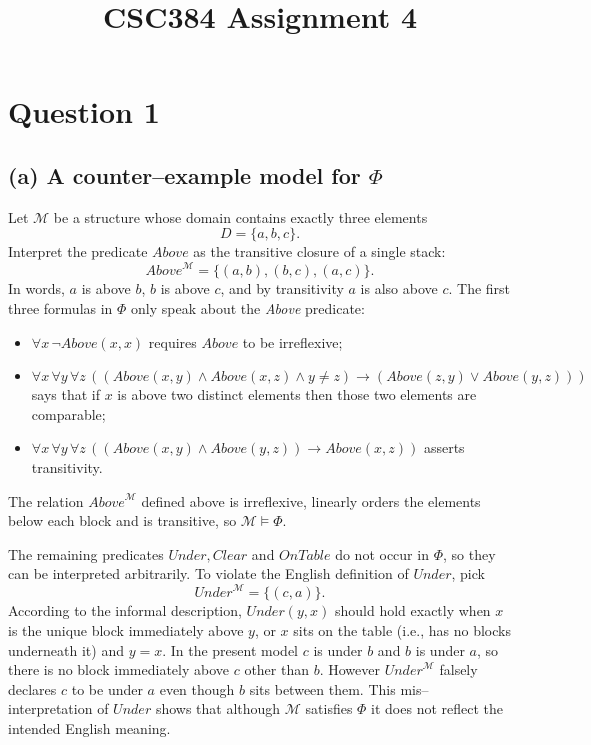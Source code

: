 \documentclass[12pt]{article}
\title{CSC384 Assignment 4}
\author{}
\date{}
\begin{document}
\maketitle

\section*{Question 1}

\subsection*{(a) A counter--example model for $\Phi$}

Let $\mathcal{M}$ be a structure whose domain contains exactly three elements
\[D = \{a,b,c\}.
\]
Interpret the predicate $\mathit{Above}$ as the transitive closure of a single stack:
\[
\mathit{Above}^\mathcal{M} = \{(a,b),(b,c),(a,c)\}.
\]
In words, $a$ is above $b$, $b$ is above $c$, and by transitivity $a$ is also above $c$.
The first three formulas in $\Phi$ only speak about the
\textit{Above} predicate:

\begin{itemize}
  \item $\forall x\,\neg \mathit{Above}(x,x)$ requires $\mathit{Above}$ to be irreflexive;
  \item $\forall x\,\forall y\,\forall z\,((\mathit{Above}(x,y) \wedge \mathit{Above}(x,z) \wedge y\neq z) \to (\mathit{Above}(z,y) \vee \mathit{Above}(y,z)))$ says that if $x$ is above two distinct elements then those two elements are comparable;
  \item $\forall x\,\forall y\,\forall z\,((\mathit{Above}(x,y) \wedge \mathit{Above}(y,z))\to \mathit{Above}(x,z))$ asserts transitivity.
\end{itemize}
The relation $\mathit{Above}^\mathcal{M}$ defined above is irreflexive, linearly orders the elements below each block and is transitive, so $\mathcal{M}\models\Phi$.

The remaining predicates $\mathit{Under},\mathit{Clear}$ and $\mathit{OnTable}$ do not occur in $\Phi$, so they can be interpreted arbitrarily.  To violate the English definition of $\mathit{Under}$, pick
\[\mathit{Under}^\mathcal{M} = \{(c,a)\}.
\]
According to the informal description, $\mathit{Under}(y,x)$ should hold exactly when $x$ is the unique block immediately above $y$, or $x$ sits on the table (i.e., has no blocks underneath it) and $y{=}x$.
In the present model $c$ is under $b$ and $b$ is under $a$, so there is no block immediately above $c$ other than $b$.
However $\mathit{Under}^\mathcal{M}$ falsely declares $c$ to be under $a$ even though $b$ sits between them.  This mis–interpretation of $\mathit{Under}$ shows that although $\mathcal{M}$ satisfies $\Phi$ it does not reflect the intended English meaning.
\end{document}
